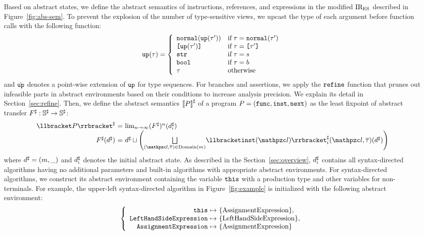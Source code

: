Based on abstract states, we define the abstract semantics of instructions,
references, and expressions in the modified ${\text{IR}_\text{ES}}$ described in
Figure~\ref{fig:abs-sem}.  To prevent the explosion of the number of type-sensitive
views, we upcast the type of each argument before function calls with the
following function:
\[
  \texttt{up}(\tau) = \left\{
    \begin{array}{ll}
      \texttt{normal}(\texttt{up}(\tau')) & \text{if} \; \tau = \texttt{normal}(\tau')\\
      \texttt{[} \texttt{up}(\tau') \texttt{]} & \text{if} \; \tau = \texttt{[} \tau' \texttt{]}\\
      \texttt{str} & \text{if} \; \tau = s\\
      \texttt{bool} & \text{if} \; \tau = b\\
      \tau & \text{otherwise}\\
    \end{array}
  \right.
\]
and $\dot{\texttt{up}}$ denotes a point-wise extension of $\texttt{up}$ for type sequences.
For branches and assertions, we apply the $\texttt{refine}$ function that prunes out
infeasible parts in abstract environments based on their conditions to increase
analysis precision.  We explain its detail in Section~\ref{sec:refine}.  Then,
we define the abstract semantics ${\llbracket{P}\rrbracket}^\sharp$ of a program $P = (\mathtt{func},
\mathtt{inst}, \mathtt{next})$ as the least fixpoint of abstract transfer ${F}^\sharp:
{\mathbb{S}}^\sharp \rightarrow {\mathbb{S}}^\sharp$:
\[
  \begin{array}{r@{~}c@{~}l}
    \asem{\prog} &=& \lim_{n \rightarrow \infty}(\atransfer)^n(\iaelem)\\
    \atransfer(\aelem) &=& \aelem \join \left(
      \underset{(\lab, \tys) \in \domain{\rmap}}{\bigjoin}
      \asemi{\getinst(\lab)}(\lab, \tys)(\aelem)
    \right)\\
  \end{array}
\]
where ${d}^\sharp = (m, \_)$ and ${d_\iota^\sharp}$ denotes the initial abstract state.
As described in the Section~\ref{sec:overview}, ${d_\iota^\sharp}$ contains all
syntax-directed algorithms having no additional parameters and built-in
algorithms with appropriate abstract environments.  For syntax-directed
algorithms, we construct its abstract environment containing the variable
$\texttt{this}$ with a production type and other variables for non-terminals.  For
example, the upper-left syntax-directed algorithm in Figure~\ref{fig:example} is
initialized with the following abstract environment:
\[
  \left\{
    \begin{array}{r@{~}c@{~}l}
      \this &\mapsto& \{ \text{AssignmentExpression} \},\\
      \mcode{LeftHandSideExpression} &\mapsto& \{ \text{LeftHandSideExpression} \},\\
      \mcode{AssignmentExpression} &\mapsto& \{ \text{AssignmentExpression} \}
    \end{array}
  \right.
\]
